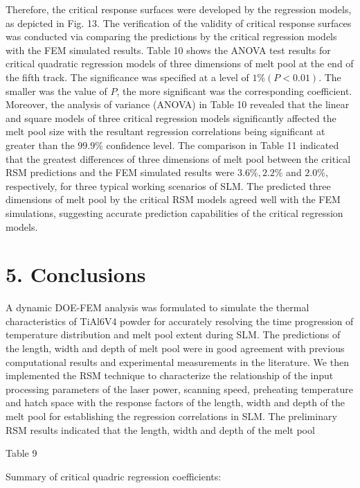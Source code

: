 \documentclass[10pt]{article}
\begin{document}
Therefore, the critical response surfaces were developed by the regression models, as depicted in Fig. 13. The verification of the validity of critical response surfaces was conducted via comparing the predictions by the critical regression models with the FEM simulated results. Table 10 shows the ANOVA test results for critical quadratic regression models of three dimensions of melt pool at the end of the fifth track. The significance was specified at a level of $1 \%(P<0.01)$. The smaller was the value of $P$, the more significant was the corresponding coefficient. Moreover, the analysis of variance (ANOVA) in Table 10 revealed that the linear and square models of three critical regression models significantly affected the melt pool size with the resultant regression correlations being significant at greater than the $99.9 \%$ confidence level. The comparison in Table 11 indicated that the greatest differences of three dimensions of melt pool between the critical RSM predictions and the FEM simulated results were $3.6 \%, 2.2 \%$ and $2.0 \%$, respectively, for three typical working scenarios of SLM. The predicted three dimensions of melt pool by the critical RSM models agreed well with the FEM simulations, suggesting accurate prediction capabilities of the critical regression models.

\section*{5. Conclusions}
A dynamic DOE-FEM analysis was formulated to simulate the thermal characteristics of TiAl6V4 powder for accurately resolving the time progression of temperature distribution and melt pool extent during SLM. The predictions of the length, width and depth of melt pool were in good agreement with previous computational results and experimental measurements in the literature. We then implemented the RSM technique to characterize the relationship of the input processing parameters of the laser power, scanning speed, preheating temperature and hatch space with the response factors of the length, width and depth of the melt pool for establishing the regression correlations in SLM. The preliminary RSM results indicated that the length, width and depth of the melt pool

Table 9

Summary of critical quadric regression coefficients:
\end{document}
